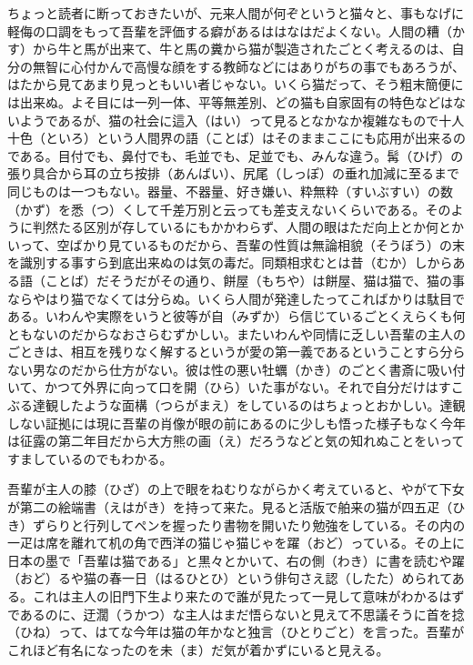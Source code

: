 \documentclass{book}
\begin{document}
ちょっと読者に断っておきたいが、元来人間が何ぞというと猫々と、事もなげに軽侮の口調をもって吾輩を評価する癖があるははなはだよくない。人間の糟（かす）から牛と馬が出来て、牛と馬の糞から猫が製造されたごとく考えるのは、自分の無智に心付かんで高慢な顔をする教師などにはありがちの事でもあろうが、はたから見てあまり見っともいい者じゃない。いくら猫だって、そう粗末簡便には出来ぬ。よそ目には一列一体、平等無差別、どの猫も自家固有の特色などはないようであるが、猫の社会に這入（はい）って見るとなかなか複雑なもので十人十色（といろ）という人間界の語（ことば）はそのままここにも応用が出来るのである。目付でも、鼻付でも、毛並でも、足並でも、みんな違う。髯（ひげ）の張り具合から耳の立ち按排（あんばい）、尻尾（しっぽ）の垂れ加減に至るまで同じものは一つもない。器量、不器量、好き嫌い、粋無粋（すいぶすい）の数（かず）を悉（つ）くして千差万別と云っても差支えないくらいである。そのように判然たる区別が存しているにもかかわらず、人間の眼はただ向上とか何とかいって、空ばかり見ているものだから、吾輩の性質は無論相貌（そうぼう）の末を識別する事すら到底出来ぬのは気の毒だ。同類相求むとは昔（むか）しからある語（ことば）だそうだがその通り、餅屋（もちや）は餅屋、猫は猫で、猫の事ならやはり猫でなくては分らぬ。いくら人間が発達したってこればかりは駄目である。いわんや実際をいうと彼等が自（みずか）ら信じているごとくえらくも何ともないのだからなおさらむずかしい。またいわんや同情に乏しい吾輩の主人のごときは、相互を残りなく解するというが愛の第一義であるということすら分らない男なのだから仕方がない。彼は性の悪い牡蠣（かき）のごとく書斎に吸い付いて、かつて外界に向って口を開（ひら）いた事がない。それで自分だけはすこぶる達観したような面構（つらがまえ）をしているのはちょっとおかしい。達観しない証拠には現に吾輩の肖像が眼の前にあるのに少しも悟った様子もなく今年は征露の第二年目だから大方熊の画（え）だろうなどと気の知れぬことをいってすましているのでもわかる。

吾輩が主人の膝（ひざ）の上で眼をねむりながらかく考えていると、やがて下女が第二の絵端書（えはがき）を持って来た。見ると活版で舶来の猫が四五疋（ひき）ずらりと行列してペンを握ったり書物を開いたり勉強をしている。その内の一疋は席を離れて机の角で西洋の猫じゃ猫じゃを躍（おど）っている。その上に日本の墨で「吾輩は猫である」と黒々とかいて、右の側（わき）に書を読むや躍（おど）るや猫の春一日（はるひとひ）という俳句さえ認（したた）められてある。これは主人の旧門下生より来たので誰が見たって一見して意味がわかるはずであるのに、迂濶（うかつ）な主人はまだ悟らないと見えて不思議そうに首を捻（ひね）って、はてな今年は猫の年かなと独言（ひとりごと）を言った。吾輩がこれほど有名になったのを未（ま）だ気が着かずにいると見える。
\end{document}
